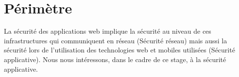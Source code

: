\section{Périmètre}
La sécurité des applications web implique la sécurité au niveau de ces infrastructures qui communiquent en réseau (Sécurité réseau) mais aussi la sécurité lors de l’utilisation des technologies web et mobiles utilisées (Sécurité applicative). Nous nous intéressons, dans le cadre de ce stage, à la sécurité applicative.

\clearpage 
